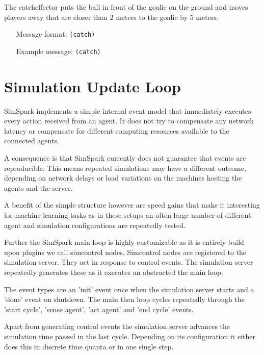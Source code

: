The catcheffector puts the ball in front of the goalie on the ground
and moves players away that are closer than 2 meters to the goalie by
5 meters.

\begin{itemize}
	\item[Message format:] \texttt{(catch)}
	\item[Example message:] \texttt{(catch)}
\end{itemize}

\section{Simulation Update Loop}


SimSpark implements a simple internal event model that immediately
executes every action received from an agent. It does not try to
compensate any network latency or compensate for different computing
resources available to the connected agents.

A consequence is that SimSpark currently does not guarantee that
events are reproducible. This means repeated simulations may have a
different outcome, depending on network delays or load variations on
the machines hosting the agents and the server.

A benefit of the simple structure however are speed gains that make it
interesting for machine learning tasks as in these setups an often
large number of different agent and simulation configurations are
repeatedly tested.

Further the SimSpark main loop is highly customizable as it is
entirely build upon plugins we call simcontrol nodes. Simcontrol nodes
are registered to the simulation server. They act in response to
control events. The simulation server repeatedly generates these as it
executes an abstracted the main loop.

The event types are an 'init' event once when the simulation server
starts and a 'done' event on shutdown. The main then loop cycles
repeatedly through the 'start cycle', 'sense agent', 'act agent' and
'end cycle' events.

Apart from generating control events the simulation server advances
the simulation time passed in the last cycle. Depending on its
configuration it either does this in discrete time quanta or in one
single step.

